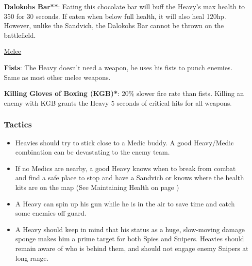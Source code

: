 {\bf Dalokohs Bar**}: Eating this chocolate bar will buff the Heavy's max health to 350 for 30 seconds. If eaten when below full health, it will also heal 120hp. However, unlike the Sandvich, the Dalokohs Bar cannot be thrown on the battlefield.

\newpage

\begin {center}
\underline {Melee}
\end {center}

{\bf Fists}: The Heavy doesn't need a weapon, he uses his fists to punch enemies. Same as most other melee weapons.

{\bf Killing Gloves of Boxing (KGB)*}: 20\% slower fire rate than fists.  Killing an enemy with KGB grants the Heavy 5 seconds of critical hits for all weapons.


\subsubsection {Tactics}
\begin {itemize}

\item Heavies should try to stick close to a Medic buddy. A good Heavy/Medic combination can be devastating to the enemy team. 

\item If no Medics are nearby, a good Heavy knows when to break from combat and find a safe place to stop and have a Sandvich or knows where the health kits are on the map (See Maintaining Health on page \pageref{Maintaining_Health})

\item A Heavy can spin up his gun while he is in the air to save time and catch some enemies off guard.

\item A Heavy should keep in mind that his status as a huge, slow-moving damage sponge makes him a prime target for both Spies and Snipers. Heavies should remain aware of who is behind them, and should not engage enemy Snipers at long range.

\end {itemize}